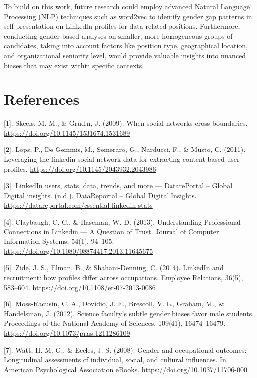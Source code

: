 \documentclass[11pt,]{article}
\begin{document}
To build on this work, future research could employ advanced Natural
Language Processing (NLP) techniques such as word2vec to identify gender
gap patterns in self-presentation on LinkedIn profiles for data-related
positions. Furthermore, conducting gender-based analyses on smaller,
more homogeneous groups of candidates, taking into account factors like
position type, geographical location, and organizational seniority
level, would provide valuable insights into nuanced biases that may
exist within specific contexts.

\hypertarget{references}{%
\section{References}\label{references}}

{[}1{]}. Skeels, M. M., \& Grudin, J. (2009). When social networks cross
boundaries. \url{https://doi.org/10.1145/1531674.1531689}

{[}2{]}. Lops, P., De Gemmis, M., Semeraro, G., Narducci, F., \& Musto,
C. (2011). Leveraging the linkedin social network data for extracting
content-based user profiles.
\url{https://doi.org/10.1145/2043932.2043986}

{[}3{]}. LinkedIn users, stats, data, trends, and more --- DatarePortal
-- Global Digital insights. (n.d.). DataReportal -- Global Digital
Insights. \url{https://datareportal.com/essential-linkedin-stats}

{[}4{]}. Claybaugh, C. C., \& Haseman, W. D. (2013). Understanding
Professional Connections in Linkedin --- A Question of Trust. Journal of
Computer Information Systems, 54(1), 94--105.
\url{https://doi.org/10.1080/08874417.2013.11645675}

{[}5{]}. Zide, J. S., Elman, B., \& Shahani-Denning, C. (2014). LinkedIn
and recruitment: how profiles differ across occupations. Employee
Relations, 36(5), 583--604.
\url{https://doi.org/10.1108/er-07-2013-0086}

{[}6{]}. Moss-Racusin, C. A., Dovidio, J. F., Brescoll, V. L., Graham,
M., \& Handelsman, J. (2012). Science faculty's subtle gender biases
favor male students. Proceedings of the National Academy of Sciences,
109(41), 16474--16479. \url{https://doi.org/10.1073/pnas.1211286109}

{[}7{]}. Watt, H. M. G., \& Eccles, J. S. (2008). Gender and
occupational outcomes: Longitudinal assessments of individual, social,
and cultural influences. In American Psychological Association eBooks.
\url{https://doi.org/10.1037/11706-000}
\end{document}
